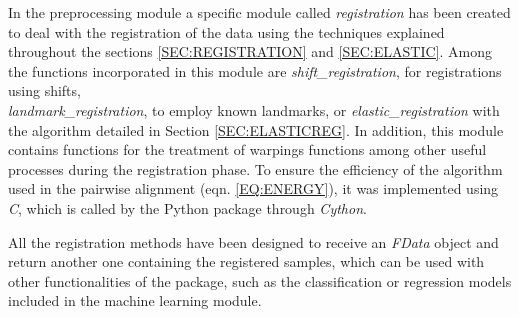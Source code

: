 
In the preprocessing module a specific module called \textit{registration} has
been created to deal with the registration of the data using the techniques
explained throughout the sections \ref{SEC:REGISTRATION} and \ref{SEC:ELASTIC}.
Among the functions incorporated in this module are \textit{shift\_registration},
for registrations using shifts,\\ \textit{landmark\_registration},
to employ known landmarks, or \textit{elastic\_registration} with the algorithm
detailed in Section \ref{SEC:ELASTICREG}.
In addition, this module contains functions for the treatment of
warpings functions among other useful processes during the registration phase.
To ensure the efficiency of the algorithm used in the pairwise alignment
(eqn. \ref{EQ:ENERGY}), it was implemented using \textit{C},
which is called by the Python package through \textit{Cython}.

All the registration methods have been designed to receive an \textit{FData} object and
return another one containing the registered samples, which can be used with
other functionalities of the package, such as the classification or regression
models included in the machine learning module.


